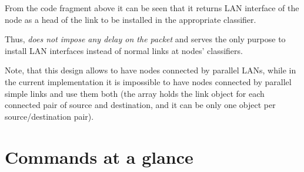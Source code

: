 From the code fragment above it can be seen that it returns LAN
interface of the node as a head of the link to be installed in the
appropriate classifier. 

Thus,  \textit{does not impose any delay on the packet}
and serves the only purpose to install LAN interfaces instead of
normal links at nodes' classifiers.  

Note, that this design allows to have nodes connected by parallel
LANs, while in the current implementation it is impossible to have
nodes connected by parallel simple links and use them both (the array
 holds the link object for each
connected pair of source and destination, and it can be only one
object per source/destination pair).

\section{Commands at a glance}
\label{sec:lancommand}

